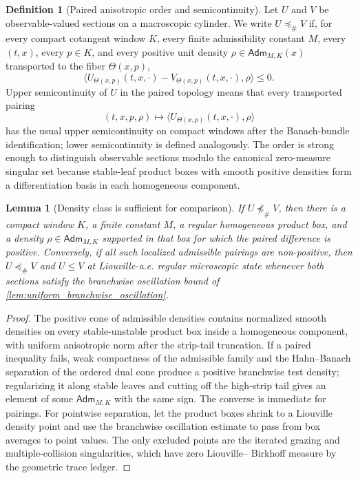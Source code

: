 \documentclass[12pt, letterpaper]{amsart}
\newcommand{\Adm}{\mathsf{Adm}}
\theoremstyle{plain}
\newtheorem{lemma}[theorem]{Lemma}
\theoremstyle{definition}
\newtheorem{definition}[theorem]{Definition}
\theoremstyle{remark}
\begin{document}
\begin{definition}[Paired anisotropic order and semicontinuity]
\label{def:paired_anisotropic_order}
Let $U$ and $V$ be observable-valued sections on a macroscopic cylinder.  We
write $U\preccurlyeq_\# V$ if, for every compact cotangent window $K$, every
finite admissibility constant $M$, every $(t,x)$, every $p\in K$, and every
positive unit density $\rho\in\Adm_{M,K}(x)$ transported to the fiber
$\Theta(x,p)$,
\begin{equation}
    \langle U_{\Theta(x,p)}(t,x,\cdot)-V_{\Theta(x,p)}(t,x,\cdot),\rho\rangle
    \le0.
\end{equation}
Upper semicontinuity of $U$ in the paired topology means that every transported
pairing
\begin{equation}
    (t,x,p,\rho)\longmapsto
    \langle U_{\Theta(x,p)}(t,x,\cdot),\rho\rangle
\end{equation}
has the usual upper semicontinuity on compact windows after the Banach-bundle
identification; lower semicontinuity is defined analogously.  The order is
strong enough to distinguish observable sections modulo the canonical
zero-measure singular set because stable-leaf product boxes with smooth
positive densities form a differentiation basis in each homogeneous component.
\end{definition}

\begin{lemma}[Density class is sufficient for comparison]
\label{lem:paired_order_separating}
If $U\not\preccurlyeq_\# V$, then there is a compact window $K$, a finite
constant $M$, a regular homogeneous product box, and a density
$\rho\in\Adm_{M,K}$ supported in that box for which the paired difference is
positive.  Conversely, if all such localized admissible pairings are
non-positive, then $U\preccurlyeq_\# V$ and $U\le V$ at Liouville-a.e. regular
microscopic state whenever both sections satisfy the branchwise oscillation
bound of \cref{lem:uniform_branchwise_oscillation}.
\end{lemma}

\begin{proof}
The positive cone of admissible densities contains normalized smooth densities
on every stable-unstable product box inside a homogeneous component, with
uniform anisotropic norm after the strip-tail truncation.  If a paired
inequality fails, weak compactness of the admissible family and the Hahn--Banach
separation of the ordered dual cone produce a positive branchwise test density;
regularizing it along stable leaves and cutting off the high-strip tail gives an
element of some $\Adm_{M,K}$ with the same sign.  The converse is immediate for
pairings.  For pointwise separation, let the product boxes shrink to a
Liouville density point and use the branchwise oscillation estimate to pass from
box averages to point values.  The only excluded points are the iterated
grazing and multiple-collision singularities, which have zero Liouville--
Birkhoff measure by the geometric trace ledger.
\end{proof}
\end{document}
